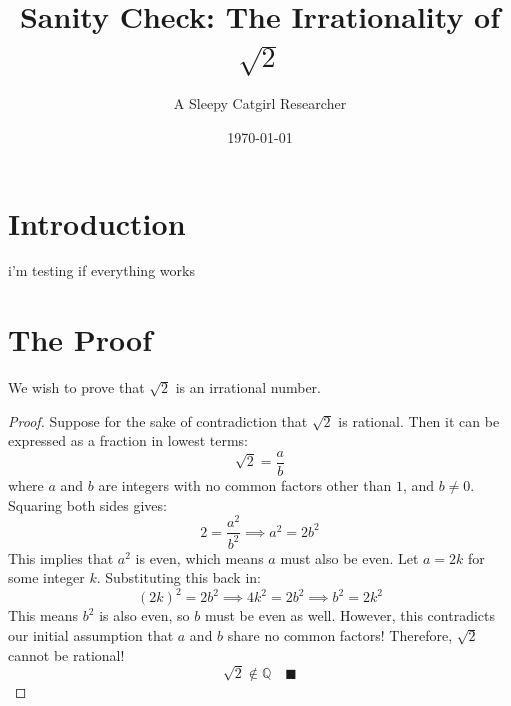 \documentclass[12pt,a4paper]{article}
\title{Sanity Check: The Irrationality of $\sqrt{2}$}
\author{A Sleepy Catgirl Researcher}
\date{\today}
\begin{document}
\maketitle

\section{Introduction}
i'm testing if everything works

\section{The Proof}
We wish to prove that $\sqrt{2}$ is an irrational number.

\begin{proof}
Suppose for the sake of contradiction that $\sqrt{2}$ is rational. Then it can be expressed as a fraction in lowest terms:
\[
\sqrt{2} = \frac{a}{b}
\]
where $a$ and $b$ are integers with no common factors other than $1$, and $b \neq 0$. Squaring both sides gives:
\[
2 = \frac{a^2}{b^2} \implies a^2 = 2b^2
\]
This implies that $a^2$ is even, which means $a$ must also be even. Let $a = 2k$ for some integer $k$. Substituting this back in:
\[
(2k)^2 = 2b^2 \implies 4k^2 = 2b^2 \implies b^2 = 2k^2
\]
This means $b^2$ is also even, so $b$ must be even as well. However, this contradicts our initial assumption that $a$ and $b$ share no common factors! Therefore, $\sqrt{2}$ cannot be rational!
\[
\sqrt{2} \notin \mathbb{Q} \quad \blacksquare
\]
\end{proof}
\end{document}
